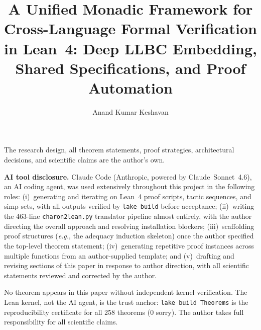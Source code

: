 \documentclass[acmsmall,screen=true,nonacm]{acmart}
\title{A Unified Monadic Framework for Cross-Language Formal Verification
       in Lean~4: Deep LLBC Embedding, Shared Specifications,
       and Proof Automation}
\author{Anand Kumar Keshavan}
\affiliation{%
  \institution{Independent Researcher}
  \city{Pune}
  \country{India}
}
\newcommand{\lakeCmd}[1]{\texttt{\small #1}}
\newcommand{\eg}{\textit{e.g.},\xspace}
\begin{document}
\maketitle

\begin{acks}
The research design, all theorem statements, proof strategies, architectural
decisions, and scientific claims are the author's own.

\textbf{AI tool disclosure.} Claude Code (Anthropic, powered by Claude~Sonnet~4.6),
an AI coding agent, was used extensively throughout this project in the following
roles: (i)~generating and iterating on Lean~4 proof scripts, tactic sequences,
and simp sets, with all outputs verified by \lakeCmd{lake build} before acceptance;
(ii)~writing the 463-line \texttt{charon2lean.py} translator pipeline almost
entirely, with the author directing the overall approach and resolving
installation blockers; (iii)~scaffolding proof structures (\eg the adequacy
induction skeleton) once the author specified the top-level theorem statement;
(iv)~generating repetitive proof instances across multiple functions from an
author-supplied template; and (v)~drafting and revising sections of this paper
in response to author direction, with all scientific statements reviewed and
corrected by the author.

No theorem appears in this paper without independent kernel verification.
The Lean kernel, not the AI agent, is the trust anchor: \lakeCmd{lake build Theorems}
is the reproducibility certificate for all 258 theorems (0 sorry).
The author takes full responsibility for all scientific claims.
\end{acks}


















\end{document}
